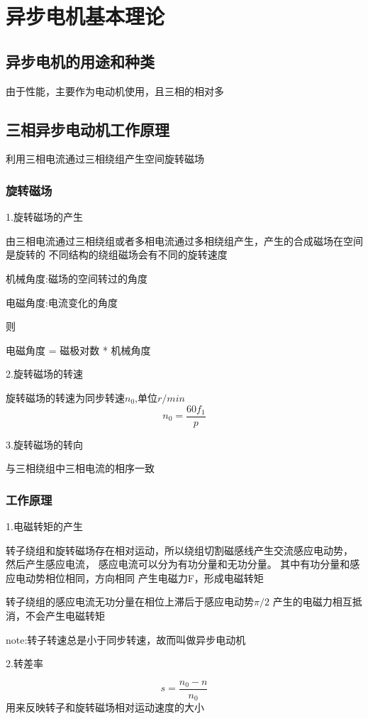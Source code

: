 \documentclass[11pt,twoside,a4paper]{ctexart}
\begin{document}
    
\section{异步电机基本理论}
\subsection{异步电机的用途和种类}

由于性能，主要作为电动机使用，且三相的相对多

\subsection{三相异步电动机工作原理}
利用三相电流通过三相绕组产生空间旋转磁场

\subsubsection{旋转磁场}
1.旋转磁场的产生

由三相电流通过三相绕组或者多相电流通过多相绕组产生，产生的合成磁场在空间是旋转的
不同结构的绕组磁场会有不同的旋转速度

机械角度:磁场的空间转过的角度

电磁角度:电流变化的角度

则

电磁角度 = 磁极对数 * 机械角度

2.旋转磁场的转速

旋转磁场的转速为同步转速$n_0$,单位$r/min$
\[n_0 = \frac{60f_1}{p}\]

3.旋转磁场的转向

与三相绕组中三相电流的相序一致

\subsubsection{工作原理}
1.电磁转矩的产生

转子绕组和旋转磁场存在相对运动，所以绕组切割磁感线产生交流感应电动势，
然后产生感应电流，
感应电流可以分为有功分量和无功分量。
其中有功分量和感应电动势相位相同，方向相同
产生电磁力F，形成电磁转矩

转子绕组的感应电流无功分量在相位上滞后于感应电动势$\pi /2$
产生的电磁力相互抵消，不会产生电磁转矩

note:转子转速总是小于同步转速，故而叫做异步电动机


2.转差率

\[s = \frac{n_0 - n}{n_0}\]
用来反映转子和旋转磁场相对运动速度的大小
\end{document}
